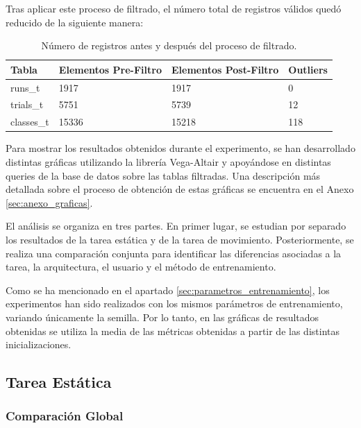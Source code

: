 Tras aplicar este proceso de filtrado, el número total de registros válidos quedó reducido de la siguiente manera:

\begin{table}[!ht]
    \centering
    \begin{tabular}{|l|l|l|l|}
        \hline
        Tabla      & Elementos Pre-Filtro & Elementos Post-Filtro & Outliers \\ \hline
        runs\_t    & 1917                 & 1917                  & 0        \\ \hline
        trials\_t  & 5751                 & 5739                  & 12       \\ \hline
        classes\_t & 15336                & 15218                 & 118      \\ \hline
    \end{tabular}
    \caption{Número de registros antes y después del proceso de filtrado.}
\end{table}

Para mostrar los resultados obtenidos durante el experimento, se han desarrollado distintas gráficas utilizando la librería Vega-Altair y apoyándose en distintas queries de la base de datos sobre las tablas filtradas. Una descripción más detallada sobre el proceso de obtención de estas gráficas se encuentra en el Anexo \ref{sec:anexo_graficas}.

El análisis se organiza en tres partes. En primer lugar, se estudian por separado los resultados de la tarea estática y de la tarea de movimiento. Posteriormente, se realiza una comparación conjunta para identificar las diferencias asociadas a la tarea, la arquitectura, el usuario y el método de entrenamiento.

Como se ha mencionado en el apartado \ref{sec:parametros_entrenamiento}, los experimentos han sido realizados con los mismos parámetros de entrenamiento, variando únicamente la semilla. Por lo tanto, en las gráficas de resultados obtenidas se utiliza la media de las métricas obtenidas a partir de las distintas inicializaciones.

\subsection{Tarea Estática} \label{sec:tareaestatica}

\subsubsection{Comparación Global}

